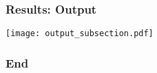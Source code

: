 \documentclass{beamer}
\begin{document}
\begin{frame}[t]\frametitle{Results: Output}

    \begin{center}
      \texttt{[image: output\_subsection.pdf]}
      \label{fig:output}
    \end{center}



\end{frame}


\begin{frame}[t]\frametitle{End}



\end{frame}
\end{document}
